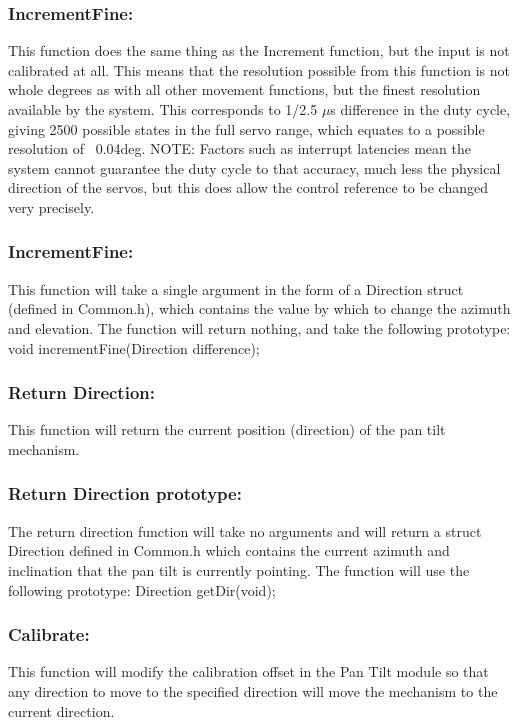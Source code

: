 \documentclass[]{article}
\begin{document}
\subsubsection{IncrementFine:}
This function does the same thing as the Increment function, but the input is not calibrated at all. This means that the resolution possible from this function is not whole degrees as with all other movement functions, but the finest resolution available by the system. This corresponds to 1/2.5 $\mu$s difference in the duty cycle, giving 2500 possible states in the full servo range, which equates to a possible resolution of ~0.04deg. \newline
NOTE: Factors such as interrupt latencies mean the system cannot guarantee the duty cycle to that accuracy, much less the physical direction of the servos, but this does allow the control reference to be changed very precisely.

\subsubsection{IncrementFine:}
This function will take a single argument in the form of a Direction struct (defined in Common.h), which contains the value by which to change the azimuth and elevation. The function will return nothing, and take the following prototype: \newline \newline
void incrementFine(Direction difference);

\subsubsection{Return Direction:}
This function will return the current position (direction) of the pan tilt mechanism.

\subsubsection{Return Direction prototype:}
The return direction function will take no arguments and will return a struct Direction defined in Common.h which contains the current azimuth and inclination that the pan tilt is currently pointing. The function will use the following prototype: \newline \newline
Direction getDir(void);

\subsubsection{Calibrate:}
This function will modify the calibration offset in the Pan Tilt module so that any direction to move to the specified direction will move the mechanism to the current direction.
\end{document}
